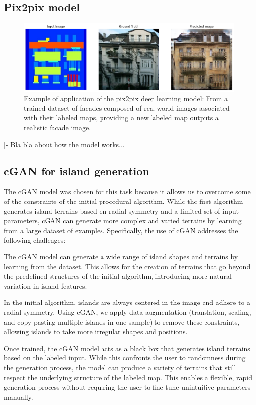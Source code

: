 \subsection{Pix2pix model}


\begin{figure}[H]
	\centering
	\includegraphics[width = 0.8 \linewidth]{example_pix2pix_facade.png}
    \caption{Example of application of the pix2pix deep learning model: From a trained dataset of facades composed of real world images associated with their labeled maps, providing a new labeled map outputs a realistic facade image. }
    \label{fig:coral-island_pix2pix-example}
\end{figure}

[- Bla bla about how the model works... ]

\subsection{cGAN for island generation}

The cGAN model was chosen for this task because it allows us to overcome some of the constraints of the initial procedural algorithm. While the first algorithm generates island terrains based on radial symmetry and a limited set of input parameters, cGAN can generate more complex and varied terrains by learning from a large dataset of examples. Specifically, the use of cGAN addresses the following challenges:
\begin{Itemize}
     The cGAN model can generate a wide range of island shapes and terrains by learning from the dataset. This allows for the creation of terrains that go beyond the predefined structures of the initial algorithm, introducing more natural variation in island features.

     In the initial algorithm, islands are always centered in the image and adhere to a radial symmetry. Using cGAN, we apply data augmentation (translation, scaling, and copy-pasting multiple islands in one sample) to remove these constraints, allowing islands to take more irregular shapes and positions.

     Once trained, the cGAN model acts as a black box that generates island terrains based on the labeled input. While this confronts the user to randomness during the generation process, the model can produce a variety of terrains that still respect the underlying structure of the labeled map. This enables a flexible, rapid generation process without requiring the user to fine-tune unintuitive parameters manually.
\end{Itemize}

